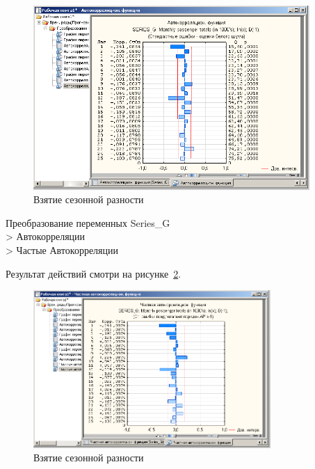 \begin{figure}[!h]
  \centering

  \includegraphics[height=7cm]
  {inc/Series_G/9.PNG}

  \caption{Взятие сезонной разности}

  \label{fig:9}
\end{figure}


\newpage

Преобразование переменных Series\_G\\
> Автокорреляции\\
> Частые Автокорреляции

Результат действий смотри на рисунке~\ref{fig:10}.

\begin{figure}[!h]
  \centering

  \includegraphics[height=6cm]
  {inc/Series_G/10.PNG}

  \caption{Взятие сезонной разности}

  \label{fig:10}
\end{figure}


